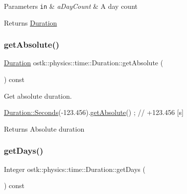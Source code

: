 \begin{DoxyParams}[1]{Parameters}
\mbox{\tt in}  & {\em a\+Day\+Count} & A day count \\
\hline
\end{DoxyParams}
\begin{DoxyReturn}{Returns}
\hyperlink{classostk_1_1physics_1_1time_1_1_duration}{Duration} 
\end{DoxyReturn}
\mbox{\label{classostk_1_1physics_1_1time_1_1_duration_a99649d50bb22e54f1ba4bd901fe3a7e3}} 
\subsubsection{\texorpdfstring{get\+Absolute()}{getAbsolute()}}
{\footnotesize\ttfamily \hyperlink{classostk_1_1physics_1_1time_1_1_duration}{Duration} ostk\+::physics\+::time\+::\+Duration\+::get\+Absolute (\begin{DoxyParamCaption}{ }\end{DoxyParamCaption}) const}



Get absolute duration. 


\begin{DoxyCode}
\hyperlink{classostk_1_1physics_1_1time_1_1_duration_ad973fa34fcc308fdcc8d50c3ee694764}{Duration::Seconds}(-123.456).\hyperlink{classostk_1_1physics_1_1time_1_1_duration_a99649d50bb22e54f1ba4bd901fe3a7e3}{getAbsolute}() ; \textcolor{comment}{// +123.456 [s]}
\end{DoxyCode}


\begin{DoxyReturn}{Returns}
Absolute duration 
\end{DoxyReturn}
\mbox{\label{classostk_1_1physics_1_1time_1_1_duration_a8902625ed4b1d8d2a23bf7c5e9f886c4}} 
\subsubsection{\texorpdfstring{get\+Days()}{getDays()}}
{\footnotesize\ttfamily Integer ostk\+::physics\+::time\+::\+Duration\+::get\+Days (\begin{DoxyParamCaption}{ }\end{DoxyParamCaption}) const}



